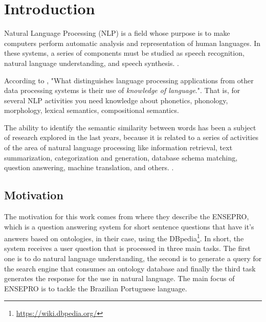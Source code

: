 \section{Introduction}\label{chap:intro}



Natural Language Processing (NLP) is a field whose purpose is to make computers perform automatic analysis and representation of human languages. In these systems, a series of components must be studied as speech recognition, natural language understanding, and speech synthesis. \cite{DBLP:journals/corr/abs-1708-02709, Jurafsky:2009:SLP:1214993}.

According to , "What distinguishes language processing applications from other data processing systems is their use of \textit{knowledge of language}.". That is, for several NLP activities you need knowledge about phonetics, phonology, morphology, lexical semantics, compositional semantics.

The ability to identify the semantic similarity between words has been a subject of research explored in the last years, because it is related to a series of activities of the area of natural language processing like information retrieval, text summarization, categorization and generation, database schema matching, question answering, machine translation, and others. \cite{Pawar2018CalculatingTS, gonccalo2018distributional, SRAVANTHI2017SemanticSB, Islam2007ApplicationsOC}. 

\subsection{Motivation} 

The motivation for this work comes from  where they describe the ENSEPRO, which is a question answering system for short sentence questions that have it's answers based on ontologies, in their case, using the DBpedia\footnote{\url{https://wiki.dbpedia.org/}}. In short, the system receives a user question that is processed in three main tasks. The first one is to do natural language understanding, the second is to generate a query for the search engine that consumes an ontology database and finally the third task generates the response for the use in natural language. The main focus of ENSEPRO is to tackle the Brazilian Portuguese language. 

